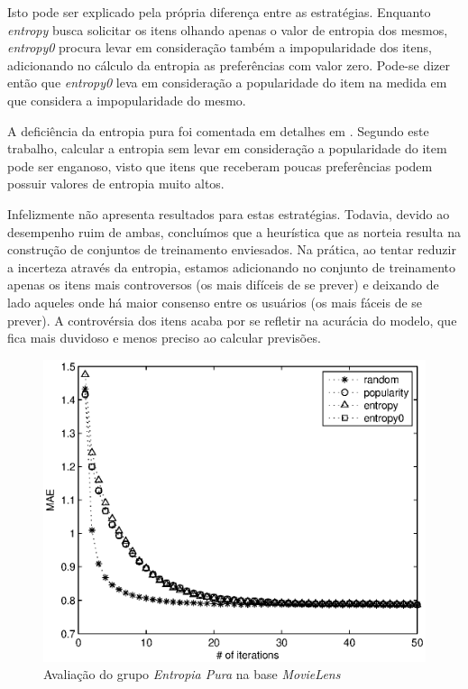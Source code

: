 Isto pode ser explicado pela própria diferença entre as estratégias. Enquanto \textit{entropy} busca solicitar os itens olhando apenas o valor de entropia dos mesmos, \textit{entropy0} procura levar em consideração também a impopularidade dos itens, adicionando no cálculo da entropia as preferências com valor zero. Pode-se dizer então que \textit{entropy0} leva em consideração a popularidade do item na medida em que considera a impopularidade do mesmo.

A deficiência da entropia pura foi comentada em detalhes em \citep{Rashid:2008:LPN:1540276.1540302}. Segundo este trabalho, calcular a entropia sem levar em consideração a popularidade do item pode ser enganoso, visto que itens que receberam poucas preferências podem possuir valores de entropia muito altos.

Infelizmente \citep{Elahi:2014:ALS:2542182.2542195} não apresenta resultados para estas estratégias. Todavia, devido ao desempenho ruim de ambas, concluímos que a heurística que as norteia resulta na construção de conjuntos de treinamento enviesados. Na prática, ao tentar reduzir a incerteza através da entropia, estamos adicionando no conjunto de treinamento apenas os itens mais controversos (os mais difíceis de se prever) e deixando de lado aqueles onde há maior consenso entre os usuários (os mais fáceis de se prever). A controvérsia dos itens acaba por se refletir na acurácia do modelo, que fica mais duvidoso e menos preciso ao calcular previsões.

\begin{figure}[ht]
\centering
\includegraphics{ml_ent_ent0.eps}
\caption{Avaliação do grupo \textit{Entropia Pura} na base \textit{MovieLens}}
\label{fig:entropia-pura-movielens}
\end{figure}

